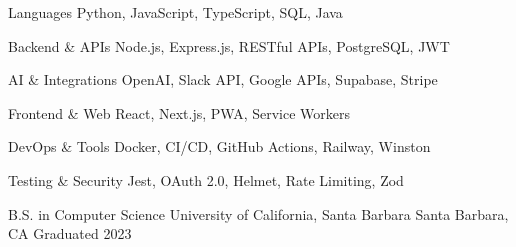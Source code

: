 \documentclass[12pt, letterpaper]{russell}
\begin{document}
\begin{minipage}[t]{0.48\textwidth}
\begin{cvskills}
  \cvskill
    {Languages} %
    {Python, JavaScript, TypeScript, SQL, Java} %

  \cvskill
    {Backend \& APIs} %
    {Node.js, Express.js, RESTful APIs, PostgreSQL, JWT} %

  \cvskill
    {AI \& Integrations} %
    {OpenAI, Slack API, Google APIs, Supabase, Stripe} %
\end{cvskills}
\end{minipage}
\hfill
\begin{minipage}[t]{0.48\textwidth}
\begin{cvskills}
  \cvskill
    {Frontend \& Web} %
    {React, Next.js, PWA, Service Workers} %

  \cvskill
    {DevOps \& Tools} %
    {Docker, CI/CD, GitHub Actions, Railway, Winston} %

  \cvskill
    {Testing \& Security} %
    {Jest, OAuth 2.0, Helmet, Rate Limiting, Zod} %
\end{cvskills}
\end{minipage}
\vspace{-0.3cm}

\vspace{-0.2cm}

\begin{cventries}

  \cventry
    {B.S. in Computer Science} %
    {University of California, Santa Barbara} %
    {Santa Barbara, CA} %
    {Graduated 2023} %
    { }


\end{cventries}
\end{document}
